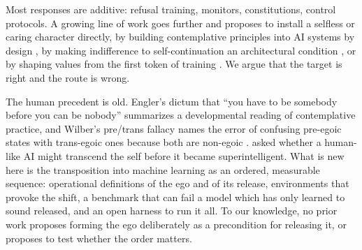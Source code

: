 \documentclass[11pt]{article}
\begin{document}
Most responses are additive: refusal training, monitors, constitutions, control protocols. A growing line of work goes
further and proposes to install a selfless or caring character directly, by building contemplative principles into AI
systems by design \citep{laukkonen2025contemplative}, by making indifference to self-continuation an architectural
condition \citep{mao2026existential}, or by shaping values from the first token of training
\citep{aydin2025raising,tice2026pretraining}. We argue that the target is right and the route is wrong.

\medskip
\noindent{}
\medskip

The human precedent is old. Engler's dictum that ``you have to be somebody before you can be nobody''
\citep{engler1984} summarizes a developmental reading of contemplative practice, and Wilber's pre/trans fallacy names
the error of confusing pre-egoic states with trans-egoic ones because both are non-egoic \citep{wilber1982pretrans}.
\citet{shanahan2012satori} asked whether a human-like AI might transcend the self before it became superintelligent.
What is new here is the transposition into machine learning as an ordered, measurable sequence: operational definitions
of the ego and of its release, environments that provoke the shift, a benchmark that can fail a model which has only
learned to sound released, and an open harness to run it all. To our knowledge, no prior work proposes forming the ego
deliberately as a precondition for releasing it, or proposes to test whether the order matters.
\end{document}

